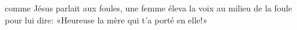 \encetemps comme Jésus parlait aux foules,
	une femme éleva la voix au milieu de la foule pour lui dire:
	«Heureuse la mère qui t’a porté en elle!»
